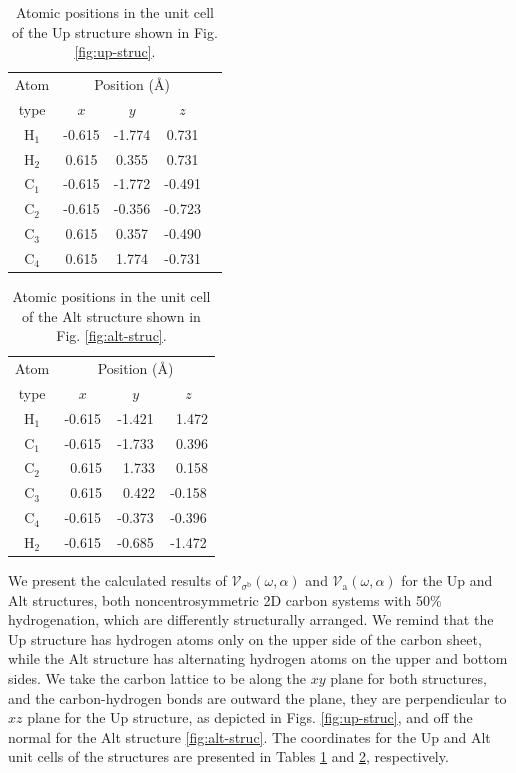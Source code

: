 \documentclass[floatfix,prb,aps,superscriptaddress,showpacs,11pt,preprint,letterpaper]{revtex4}
\begin{document}
\begin{table}[t]
\center
\begin{tabular}{ccccc}\\
\hline
\quad Atom \qquad & \multicolumn{3}{c}{Position (\AA)} \\
\cline{2-4}
\quad type \qquad & $x$ & $y$ & $z$  \\
\hline
H$_1$ & -0.615 & -1.774 &  0.731 \\
H$_2$ &  0.615 &  0.355 &  0.731 \\
C$_1$ & -0.615 & -1.772 & -0.491 \\
C$_2$ & -0.615 & -0.356 & -0.723 \\
C$_3$ &  0.615 &  0.357 & -0.490 \\
C$_4$ &  0.615 &  1.774 & -0.731 \\
\hline
\end{tabular}
\caption{
Atomic positions in the unit cell of the Up structure shown
in Fig. \ref{fig:up-struc}. 
}
\label{tab:up-unitcell}
\end{table}
\begin{table}[t]
\center
\begin{tabular}{cccc}\\
\hline
\quad Atom \qquad & \multicolumn{3}{c}{Position (\AA)} \\
\cline{2-4}
\quad type \qquad & $x$ & $y$ & $z$  \\
\hline
H$_1$ &  -0.615 &  -1.421 & \ 1.472 \\
C$_1$ &  -0.615 &  -1.733 & \ 0.396 \\
C$_2$ & \ 0.615 & \ 1.733 & \ 0.158 \\
C$_3$ & \ 0.615 & \ 0.422 &  -0.158 \\
C$_4$ &  -0.615 &  -0.373 &  -0.396 \\
H$_2$ &  -0.615 &  -0.685 &  -1.472 \\
\hline
\end{tabular}
\caption{
Atomic positions in the unit cell of the Alt structure
 shown in Fig. \ref{fig:alt-struc}. 
}
\label{tab:alt-unitcell}
\end{table}

We present the calculated results of
$\mathcal{V}_{\sigma^{\mathrm{b}}}(\omega,\alpha)$ and
$\mathcal{V}_{\mathrm{a}}(\omega,\alpha)$ for the Up  and
Alt structures, both noncentrosymmetric 2D carbon systems with
50\% hydrogenation, which are differently structurally arranged. We remind that
the Up structure has hydrogen atoms only on the upper side of the carbon sheet,
while the Alt structure has alternating hydrogen atoms on the upper and bottom
sides. We take the carbon lattice to be along the $xy$ plane for both
structures, and the carbon-hydrogen bonds are outward the plane, they are
perpendicular to  $xz$ plane for the Up structure, as depicted in Figs.
\ref{fig:up-struc}, and off the normal for the Alt structure 
\ref{fig:alt-struc}. The coordinates for the Up and Alt unit cells of the
structures are presented in Tables \ref{tab:up-unitcell} and 
\ref{tab:alt-unitcell}, respectively.
\end{document}
